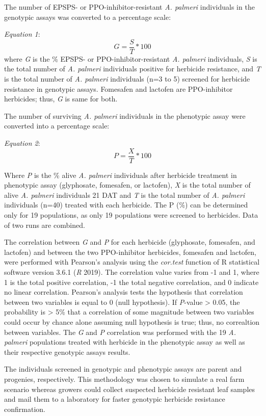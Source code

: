 \documentclass[
  12pt,
  a4paper]{article}
\begin{document}
The number of EPSPS- or PPO-inhibitor-resistant \emph{A. palmeri}
individuals in the genotypic assays was converted to a percentage scale:

\emph{Equation 1}: \[G=\frac{S}{T} * 100 \] \noindent where \emph{G} is
the \% EPSPS- or PPO-inhibitor-resistant \emph{A. palmeri} individuals,
\emph{S} is the total number of \emph{A. palmeri} individuals positive
for herbicide resistance, and \emph{T} is the total number of \emph{A.
palmeri} individuals (n=3 to 5) screened for herbicide resistance in
genotypic assays. Fomesafen and lactofen are PPO-inhibitor herbicides;
thus, \emph{G} is same for both.

The number of surviving \emph{A. palmeri} individuals in the phenotypic
assay were converted into a percentage scale:

\emph{Equation 2}: \[P=\frac{X}{T} * 100 \]

Where \emph{P} is the \% alive \emph{A. palmeri} individuals after
herbicide treatment in phenotypic assay (glyphosate, fomesafen, or
lactofen), \emph{X} is the total number of alive \emph{A. palmeri}
individuals 21 DAT and \emph{T} is the total number of \emph{A. palmeri}
individuals (n=40) treated with each herbicide. The P (\%) can be
determined only for 19 populations, as only 19 populations were screened
to herbicides. Data of two runs are combined.

The correlation between \emph{G} and \emph{P} for each herbicide
(glyphosate, fomesafen, and lactofen) and between the two PPO-inhibitor
herbicides, fomesafen and lactofen, were performed with Pearson's
analysis using the \emph{cor.test} function of R statistical software
version 3.6.1 (\emph{R} 2019). The correlation value varies from -1 and
1, where 1 is the total positive correlation, -1 the total negative
correlation, and 0 indicate no linear correlation. Pearson's analysis
tests the hypothesis that correlation between two variables is equal to
0 (null hypothesis). If \emph{P}-value \textgreater{} 0.05, the
probability is \textgreater{} 5\% that a correlation of some magnitude
between two variables could occur by chance alone assuming null
hypothesis is true; thus, no correaltion between variables. The \emph{G}
and \emph{P} correlation was performed with the 19 \emph{A. palmeri}
populations treated with herbicide in the phenotypic assay as well as
their respective genotypic assays results.

The individuals screened in genotypic and phenotypic assays are parent
and progenies, respectively. This methodology was chosen to simulate a
real farm scenario whereas growers could collect suspected herbicide
resistant leaf samples and mail them to a laboratory for faster
genotypic herbicide resistance confirmation.
\end{document}
